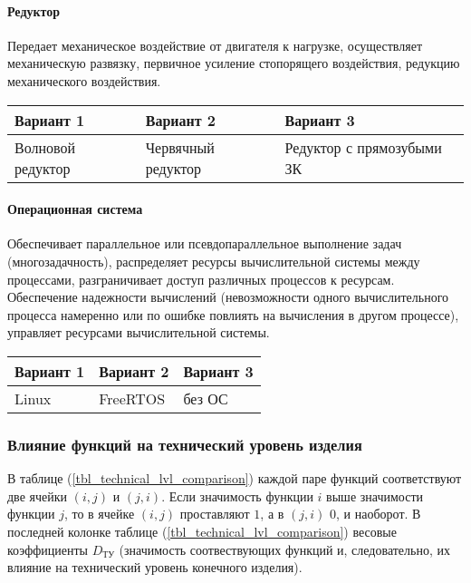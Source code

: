 \paragraph{Редуктор}
Передает механическое воздействие от двигателя к
нагрузке, осуществляет механическую развязку, первичное усиление
стопорящего воздействия, редукцию механического воздействия.

\begin{tabular}{|p{5cm}|p{5cm}|p{5cm}|}
    \hline
    Вариант 1 & Вариант 2 & Вариант 3 \\
    \hline
    Волновой редуктор &
    Червячный редуктор &
    Редуктор с прямозубыми ЗК \\
    \hline
\end{tabular}

\paragraph{Операционная система}
Обеспечивает параллельное или псевдопараллельное
выполнение задач (многозадачность), распределяет ресурсы вычислительной
системы между процессами, разграничивает доступ различных процессов к
ресурсам. Обеспечение надежности вычислений (невозможности одного
вычислительного процесса намеренно или по ошибке повлиять на вычисления
в другом процессе), управляет ресурсами вычислительной системы.

\begin{tabular}{|p{5cm}|p{5cm}|p{5cm}|}
    \hline
    Вариант 1 & Вариант 2 & Вариант 3 \\
    \hline
    Linux &
    FreeRTOS &
    без ОС \\
    \hline
\end{tabular}


\subsubsection{Влияние функций на технический уровень изделия}
В таблице (\ref{tbl_technical_lvl_comparison}) каждой паре функций
соответствуют две ячейки $(i, j)$ и $(j, i)$.
Если значимость функции $i$ выше значимости функции
$j$, то в ячейке $(i, j)$ проставляют $1$, а в $(j, i)$ $0$, и наоборот.
В последней колонке таблице (\ref{tbl_technical_lvl_comparison}) весовые
коэффициенты $D_{\text{ТУ}}$ (значимость соотвествующих функций и, следовательно,
их влияние на технический уровень конечного изделия).

